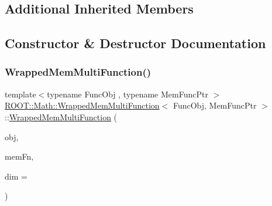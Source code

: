 \subsection*{Additional Inherited Members}


\subsection{Constructor \& Destructor Documentation}
\mbox{\label{classROOT_1_1Math_1_1WrappedMemMultiFunction_a611b693f11a43c474d2292e7aadb0811}} 
\subsubsection{\texorpdfstring{WrappedMemMultiFunction()}{WrappedMemMultiFunction()}\hspace{0.1cm}{\footnotesize\ttfamily [1/3]}}
{\footnotesize\ttfamily template$<$typename Func\+Obj , typename Mem\+Func\+Ptr $>$ \\
\mbox{\hyperlink{classROOT_1_1Math_1_1WrappedMemMultiFunction}{R\+O\+O\+T\+::\+Math\+::\+Wrapped\+Mem\+Multi\+Function}}$<$ Func\+Obj, Mem\+Func\+Ptr $>$\+::\mbox{\hyperlink{classROOT_1_1Math_1_1WrappedMemMultiFunction}{Wrapped\+Mem\+Multi\+Function}} (\begin{DoxyParamCaption}\item[{Func\+Obj \&}]{obj,  }\item[{Mem\+Func\+Ptr}]{mem\+Fn,  }\item[{unsigned int}]{dim = {} }\end{DoxyParamCaption})\hspace{0.3cm}{\ttfamily [inline]}}

